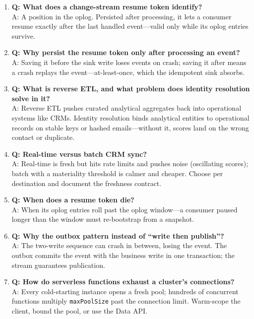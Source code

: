 \begin{enumerate}
    \item \textbf{Q: What does a change-stream resume token identify?}\\
    A: A position in the oplog. Persisted after processing, it lets a consumer resume exactly after the last handled event---valid only while its oplog entries survive.

    \item \textbf{Q: Why persist the resume token only after processing an event?}\\
    A: Saving it before the sink write loses events on crash; saving it after means a crash replays the event---at-least-once, which the idempotent sink absorbs.

    \item \textbf{Q: What is reverse ETL, and what problem does identity resolution solve in it?}\\
    A: Reverse ETL pushes curated analytical aggregates back into operational systems like CRMs. Identity resolution binds analytical entities to operational records on stable keys or hashed emails---without it, scores land on the wrong contact or duplicate.

    \item \textbf{Q: Real-time versus batch CRM sync?}\\
    A: Real-time is fresh but hits rate limits and pushes noise (oscillating scores); batch with a materiality threshold is calmer and cheaper. Choose per destination and document the freshness contract.

    \item \textbf{Q: When does a resume token die?}\\
    A: When its oplog entries roll past the oplog window---a consumer paused longer than the window must re-bootstrap from a snapshot.

    \item \textbf{Q: Why the outbox pattern instead of ``write then publish''?}\\
    A: The two-write sequence can crash in between, losing the event. The outbox commits the event with the business write in one transaction; the stream guarantees publication.

    \item \textbf{Q: How do serverless functions exhaust a cluster's connections?}\\
    A: Every cold-starting instance opens a fresh pool; hundreds of concurrent functions multiply \texttt{maxPoolSize} past the connection limit. Warm-scope the client, bound the pool, or use the Data API.
\end{enumerate}

